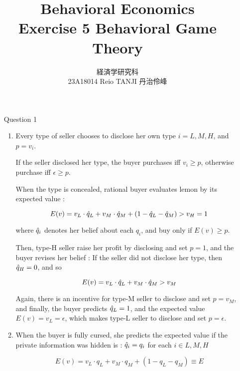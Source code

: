 \documentclass{jsarticle}
\begin{document}
\title{Behavioral Economics \\
Exercise 5 Behavioral Game Theory}
\author{経済学研究科　 \\ 23A18014 Reio TANJI 丹治伶峰}
\date{}
\maketitle

\begin{enumerate}

\item [Question 1]

 \begin{enumerate}
 \item
 
 Every type of seller chooses to disclose her own type $i = {L, M, H}$, and $p = v_i$.
 
 If the seller disclosed her type, the buyer purchases iff $v_i \geq p$, otherwise purchase iff $\epsilon \geq p$.
 
 \vspace{0.7zw}
 
 \hspace{2zw}When the type is concealed, rational buyer evaluates lemon by its expected value : 
 
 \[ E(v) = v_L \cdot \Hat{q}_L + v_M \cdot \Hat{q}_M + (1 - \Hat{q}_L - \Hat{q}_M) > v_H = 1 \]
 
 where $\Hat{q}_i$ denotes her belief about each $q_i$, and buy only if $E(v) \geq p$.
 
 Then, type-H seller raise her profit by disclosing and set $p = 1$, and the buyer revises her belief : If the seller did not disclose her type, then $\Hat{q}_H = 0$, and so
 
 \[ E(v) = v_L \cdot \Hat{q}_L + v_M \cdot \Hat{q}_M > v_M \]
 
 Again, there is an incentive for type-M seller to disclose and set $p = v_M$, and finally, the buyer predicts $\Hat{q}_L = 1$, and the expected value $E(v) = v_L = \epsilon$, which makes type-L seller to disclose and set $p = \epsilon$.
 
 \vspace{1zw}
  \item \hspace{2zw} When the buyer  is fully cursed, she predicts the expected value if the private information was hidden is : $\Hat{q}_i = q_i$ for each $i \in {L,M,H}$
  
  \[E(v) = v_L \cdot q_L + v_M \cdot q_M + (1 - q_L - q_M) \equiv E \]
 

\end{enumerate}
\end{enumerate}
\end{document}
